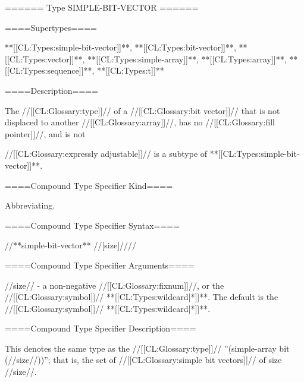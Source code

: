 ====== Type SIMPLE-BIT-VECTOR ======

====Supertypes====

**[[CL:Types:simple-bit-vector]]**, **[[CL:Types:bit-vector]]**, **[[CL:Types:vector]]**, **[[CL:Types:simple-array]]**, **[[CL:Types:array]]**, **[[CL:Types:sequence]]**, **[[CL:Types:t]]**

====Description====

The //[[CL:Glossary:type]]// of a //[[CL:Glossary:bit vector]]// that is not displaced to another //[[CL:Glossary:array]]//, has no //[[CL:Glossary:fill pointer]]//, and is not

//[[CL:Glossary:expressly adjustable]]// is a subtype of **[[CL:Types:simple-bit-vector]]**.

====Compound Type Specifier Kind====

Abbreviating.

====Compound Type Specifier Syntax====

//**simple-bit-vector** //[size]////

====Compound Type Specifier Arguments====

//size// - a non-negative //[[CL:Glossary:fixnum]]//, or the //[[CL:Glossary:symbol]]// **[[CL:Types:wildcard|*]]**. The default is the //[[CL:Glossary:symbol]]// **[[CL:Types:wildcard|*]]**.

====Compound Type Specifier Description====

This denotes the same type as the //[[CL:Glossary:type]]// ''(simple-array bit (//size//))''; that is, the set of //[[CL:Glossary:simple bit vectors]]// of size //size//.

